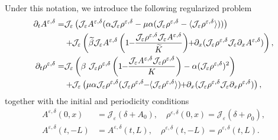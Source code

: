 \documentclass[12pt]{amsart}
\newcommand{\Jrho}{\mathcal{J_\varepsilon}\rho^{\varepsilon,\delta}}
\newcommand{\JA}{\mathcal{J_\varepsilon}A^{\varepsilon,\delta}}
\newcommand{\JAuno}{\mathcal{J_\varepsilon}\partial_x A^{\varepsilon,\delta}}
\begin{document}
	Under this notation,  we introduce the following regularized problem
	\begin{equation}\label{RegularizedEpsDelta}
			\begin{split}
			 \partial_t A^{\varepsilon,\delta}=& \mathcal{J_\varepsilon}\left( \JA(\alpha\Jrho-\mu\alpha(\Jrho-\langle \Jrho \rangle))\right)\\
			&+\hspace{-0,1cm}\mathcal{J_\varepsilon}\left(\widetilde{\beta}\JA\left(1\hspace{-0,1cm}-\hspace{-0,1cm}\frac{\Jrho \JA}{\widetilde{K}} \right)\hspace{-0,1cm}+\hspace{-0,1cm} \partial_x(\Jrho \JAuno)\right),\\ 
			\partial_t\rho^{\varepsilon,\delta}=&\mathcal{J_\varepsilon}\left(\beta\ \Jrho\left(1\hspace{-0,1cm}-\hspace{-0,1cm}\frac{\JA\Jrho}{K} \right)-\alpha(\Jrho)^2\right)\\
			&+\hspace{-0,1cm}\mathcal{J_\varepsilon}\left(\mu\alpha\Jrho(\Jrho\hspace{-0,1cm}-\hspace{-0,1cm}\langle \Jrho\rangle)\hspace{-0,1cm}+\hspace{-0,1cm}\partial_{x}(\Jrho \mathcal{J_\varepsilon}\partial_{x}\rho^{\varepsilon,\delta})\right),
            \end{split}
	        \end{equation}
        together with the initial and periodicity conditions
\begin{equation}
\begin{split}
			A^{\varepsilon,\delta}(0,x)&=\mathcal{J}_\varepsilon(\delta+A_0),\quad \rho^{\varepsilon,\delta}(0,x)=\mathcal{J}_\varepsilon(\delta+\rho_0),\\
			A^{\varepsilon,\delta}(t,-L)&=A^{\varepsilon,\delta}(t,L),\quad\rho^{\varepsilon,\delta}(t,-L)=\rho^{\varepsilon,\delta}(t,L).			 
		\end{split}
	\end{equation}
	
\end{document}
